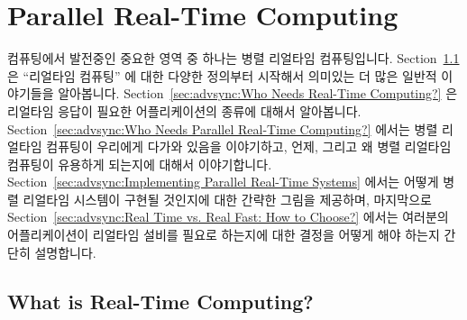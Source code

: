 
\section{Parallel Real-Time Computing}
\label{sec:advsync:Parallel Real-Time Computing}
%

컴퓨팅에서 발전중인 중요한 영역 중 하나는 병렬 리얼타임 컴퓨팅입니다.
Section~\ref{sec:advsync:What is Real-Time Computing?}
은 ``리얼타임 컴퓨팅'' 에 대한 다양한 정의부터 시작해서 의미있는 더 많은 일반적
이야기들을 알아봅니다.
Section~\ref{sec:advsync:Who Needs Real-Time Computing?}
은 리얼타임 응답이 필요한 어플리케이션의 종류에 대해서 알아봅니다.
Section~\ref{sec:advsync:Who Needs Parallel Real-Time Computing?}
에서는 병렬 리얼타임 컴퓨팅이 우리에게 다가와 있음을 이야기하고, 언제, 그리고
왜 병렬 리얼타임 컴퓨팅이 유용하게 되는지에 대해서 이야기합니다.
Section~\ref{sec:advsync:Implementing Parallel Real-Time Systems}
에서는 어떻게 병렬 리얼타임 시스템이 구현될 것인지에 대한 간략한 그림을
제공하며, 마지막으로
Section~\ref{sec:advsync:Real Time vs. Real Fast: How to Choose?}
에서는 여러분의 어플리케이션이 리얼타임 설비를 필요로 하는지에 대한 결정을
어떻게 해야 하는지 간단히 설명합니다.

\subsection{What is Real-Time Computing?}
\label{sec:advsync:What is Real-Time Computing?}


